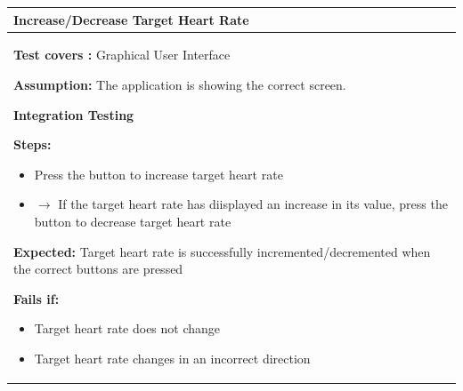 \documentclass[letterpaper,english, 12pt]{scrreprt}
\begin{document}
\begin{center}
        \begin{tabular}{|C{15cm}|}
                \hline
                        \textbf{Increase/Decrease Target Heart Rate}\\
                \hline
                        \begin{flushleft}
                                \textbf{Test covers : } Graphical User Interface
                        \end{flushleft}
                        \begin{flushleft}
                                \textbf{Assumption: } The application is showing the correct screen.
                        \end{flushleft}
			\begin{center}
				\textbf{Integration Testing}
			\end{center}
                        \begin{flushleft}
                                \textbf{Steps:}
                        \end{flushleft}
				\begin{itemize}
					\item Press the button to increase target heart rate
					\item $\rightarrow$ If the target heart rate has diisplayed an increase in its value, press the button to decrease target heart rate
				\end{itemize}
			\begin{flushleft}
				\textbf{Expected: } Target heart rate is successfully incremented/decremented when the correct buttons are pressed
			\end{flushleft}
                        \begin{flushleft}
                                \textbf{Fails if: }
                        \end{flushleft}
                                \begin{itemize}
                                        \item Target heart rate does not change
					\item Target heart rate changes in an incorrect direction
                                \end{itemize}
				\\
		\hline
        \end{tabular}
\end{center}
\end{document}
